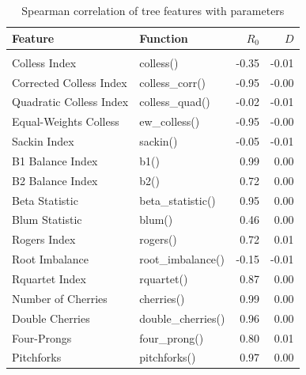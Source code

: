 \begin{table}

\caption{\label{tab:tab:treefeatures}Spearman correlation of tree features with parameters}
\centering
\begin{tabular}[t]{llrr}
\toprule
Feature & Function & $R_0$ & $D$\\
\midrule
\addlinespace[0.3em]
\multicolumn{4}{l}{\textbf{Balance \& Topology}}\\
\hspace{1em}Colless Index & colless() & -0.35 & -0.01\\
\hspace{1em}Corrected Colless Index & colless\_corr() & -0.95 & -0.00\\
\hspace{1em}Quadratic Colless Index & colless\_quad() & -0.02 & -0.01\\
\hspace{1em}Equal-Weights Colless & ew\_colless() & -0.95 & -0.00\\
\hspace{1em}Sackin Index & sackin() & -0.05 & -0.01\\
\hspace{1em}B1 Balance Index & b1() & 0.99 & 0.00\\
\hspace{1em}B2 Balance Index & b2() & 0.72 & 0.00\\
\hspace{1em}Beta Statistic & beta\_statistic() & 0.95 & 0.00\\
\hspace{1em}Blum Statistic & blum() & 0.46 & 0.00\\
\hspace{1em}Rogers Index & rogers() & 0.72 & 0.01\\
\hspace{1em}Root Imbalance & root\_imbalance() & -0.15 & -0.01\\
\hspace{1em}Rquartet Index & rquartet() & 0.87 & 0.00\\
\hspace{1em}Number of Cherries & cherries() & 0.99 & 0.00\\
\hspace{1em}Double Cherries & double\_cherries() & 0.96 & 0.00\\
\hspace{1em}Four-Prongs & four\_prong() & 0.80 & 0.01\\
\hspace{1em}Pitchforks & pitchforks() & 0.97 & 0.00\\

\end{tabular}
\end{table}
